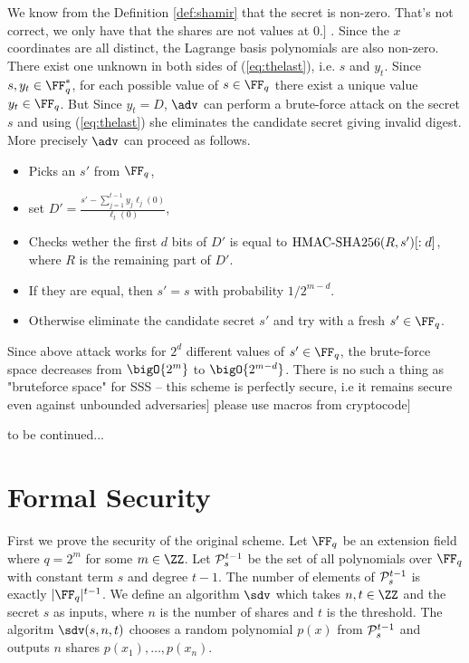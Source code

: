 \documentclass[envcountsame,runningheads,notitlepage]{llncs}
\DeclareRobustCommand{\michals}[2] {{\color{magenta}{$\big[$\scriptsize\textsf{Michal #1:}} #2$\big]$}}
\begin{document}
	We know from the Definition \ref{def:shamir} that the secret is non-zero. \michals{12.03.22}{That's not correct, we only have that the shares are not values at 0.} . Since the $x$ coordinates are all distinct, the Lagrange basis polynomials are also non-zero. There exist one unknown in both sides of (\ref{eq:thelast}), i.e. $s$ and $y_{t}$. Since $s, y_{t} \in \FF_q^{*}$, for each possible value of $s \in \FF_q$ there exist a unique value $y_{t} \in \FF_q$. But Since $y_{t} = D$, $\adv$ can perform a brute-force attack on the secret $s$ and using (\ref{eq:thelast}) she eliminates the candidate secret giving invalid digest. More precisely $\adv$ can proceed as follows.
	\begin{itemize}
		\item Picks an $s'$ from $\FF_q$,
		\item set $D' = \frac{s' - \sum\limits_{j = 1}^{t-1} y_{j}\ell_{j}(0)}{\ell_{t}(0)}$,
		\item Checks wether the first $d$ bits of $D'$ is equal to ${\textrm{HMAC-SHA256}}(R, s')[:d]$, where $R$ is the remaining part of $D'$.
		\item If they are equal, then $s' = s$ with probability $1/2^{m - d}$. 
		\item Otherwise eliminate the candidate secret $s'$ and try with a fresh $s' \in \FF_q$. 
	\end{itemize}
	Since above attack works for $2^{d}$ different values of $s' \in \FF_q$, the brute-force space decreases from $\bigO{2^{m}}$ to $\bigO{2^{m - d}}$. \michals{13.03}{There is no such a thing as "bruteforce space" for SSS -- this scheme is perfectly secure, i.e it remains secure even against unbounded adversaries}
	\michals{13.03.22}{please use macros from cryptocode}
	
	to be continued...
	
	
	\section{Formal Security}
	First we prove the security of the original scheme.	
	Let $\FF_{q}$ be an extension field where $q = 2^{m}$ for some $m \in \ZZ$. 
	Let ${\mathcal P}_{s}^{t - 1}$ be the set of all polynomials over $\FF_{q}$ with constant term $s$ and degree $t - 1$.
	The number of elements of ${\mathcal P}_{s}^{t - 1}$ is exactly $|\FF_{q}|^{t-1}$. 
	We define an algorithm $\sdv$ which takes $n, t \in \ZZ$ and the secret $s$ as inputs, where $n$ is the number of shares and $t$ is the threshold. 
	The algoritm $\sdv(s, n, t)$ chooses a random polynomial $p(x)$ from ${\mathcal P}_{s}^{t - 1}$ and outputs $n$ shares $p(x_1), \ldots, p(x_n)$.
	
\end{document}
